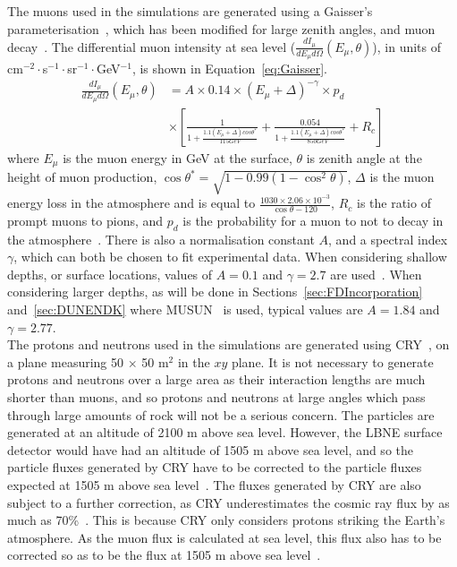 The muons used in the simulations are generated using a Gaisser's parameterisation~\citep{Gaisser}, which has been modified for large zenith angles, and muon decay~\citep{PhysRevD.58.092005}. The differential muon intensity at sea level ($\frac{dI_{\mu}}{dE_{\mu} d\Omega}(E_{\mu}, \theta)$), in units of cm$^{-2}\cdot$s$^{-1}\cdot$sr$^{-1}\cdot$GeV$^{-1}$, is shown in Equation~\ref{eq:Gaisser}.
\begin{equation}
   \begin{aligned}
      \label{eq:Gaisser}
      \frac{dI_{\mu}}{dE_{\mu} d\Omega}(E_{\mu}, \theta) &=
      A \times 0.14\times (E_{\mu} + \Delta)^{-\gamma} \times p_{d} \\
      &\times \left[ \frac{1}{1 + \frac{ 1.1(E_{\mu}+\Delta)cos\theta^{*} }{ 115 GeV } } +
      \frac{0.054}{1 + \frac{1.1(E_{\mu}+\Delta)cos\theta^{*}}{850 GeV}} + R_{c} \right]
   \end{aligned}
\end{equation} 
where $E_{\mu}$ is the muon energy in GeV at the surface, $\theta$ is zenith angle at the height of muon production, $\cos\theta^{*} = \sqrt{1-0.99(1-\cos^{2}\theta)}$, $\Delta$ is the muon energy loss in the atmosphere and is equal to $\frac{1030\times2.06\times10^{-3}}{\cos\theta-120}$, $R_{c}$ is the ratio of prompt muons to pions, and $p_d$ is the probability for a muon to not to decay in the atmosphere~\citep{PhysRevLett.51.227}. There is also a normalisation constant $A$, and a spectral index $\gamma$, which can both be chosen to fit experimental data. When considering shallow depths, or surface locations, values of $A=0.1$ and $\gamma=2.7$ are used~\citep{Gaisser}. When considering larger depths, as will be done in Sections~\ref{sec:FDIncorporation} and~\ref{sec:DUNENDK} where MUSUN~\citep{MUSUN, MUSUN2} is used, typical values are $A=1.84$ and $\gamma=2.77$. \\

The protons and neutrons used in the simulations are generated using CRY~\citep{CRY,CRY2}, on a plane measuring 50 $\times$ 50 m$^{2}$ in the $xy$ plane. It is not necessary to generate protons and neutrons over a large area as their interaction lengths are much shorter than muons, and so protons and neutrons at large angles which pass through large amounts of rock will not be a serious concern. The particles are generated at an altitude of 2100 m above sea level. However, the LBNE surface detector would have had an altitude of 1505 m above sea level, and so the particle fluxes generated by CRY have to be corrected to the particle fluxes expected at 1505 m above sea level~\citep{MartinsThesis}. The fluxes generated by CRY are also subject to a further correction, as CRY underestimates the cosmic ray flux by as much as 70\%~\citep{LBNE7517}. This is because CRY only considers protons striking the Earth's atmosphere. As the muon flux is calculated at sea level, this flux also has to be corrected so as to be the flux at 1505 m above sea level~\citep{MartinsThesis}. \\

